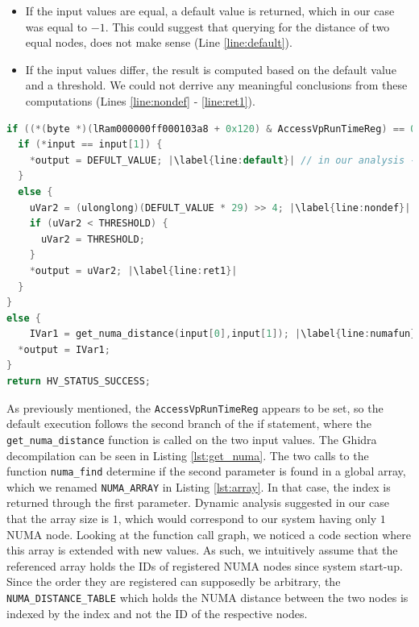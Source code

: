 \documentclass[runningheads]{llncs}
\newcommand{\cc}{\lstinline[mathescape]}
\begin{document}
\begin{itemize}
    \item If the input values are equal, a default value is returned, which
        in our case was equal to $-1$. This could suggest that querying for
        the distance of two equal nodes, does not make sense (Line
        \ref{line:default}).
    \item If the input values differ, the result is computed based on the 
        default value and a threshold. We could not derrive any meaningful
        conclusions from these computations (Lines \ref{line:nondef} -
        \ref{line:ret1}).
\end{itemize}

\vspace{-2mm}
\begin{lstlisting}[language=c, label={lst:numaif}, 
    caption={Decompilartion of the \cc{HvCallQueryNumaDistance} hypercall
    handler, after being ``beautified'' in Gidra.}]
if ((*(byte *)(lRam000000ff000103a8 + 0x120) & AccessVpRunTimeReg) == 0) {
  if (*input == input[1]) {
    *output = DEFULT_VALUE; |\label{line:default}| // in our analysis -1
  }
  else {
    uVar2 = (ulonglong)(DEFULT_VALUE * 29) >> 4; |\label{line:nondef}|
    if (uVar2 < THRESHOLD) {
      uVar2 = THRESHOLD;
    }
    *output = uVar2; |\label{line:ret1}|
  }
}
else {
    IVar1 = get_numa_distance(input[0],input[1]); |\label{line:numafun}|
  *output = IVar1;
}
return HV_STATUS_SUCCESS;
\end{lstlisting}

\vspace{-1mm}

As previously mentioned, the \cc{AccessVpRunTimeReg} appears to be set, so the
default execution follows the second branch of the if statement, where the
\\\cc{get_numa_distance} function is called on the two input values. The Ghidra
decompilation can be seen in Listing \ref{lst:get_numa}. The two calls to the
function \cc{numa_find} determine if the second parameter is found in a global
array, which we renamed \cc{NUMA_ARRAY} in Listing \ref{lst:array}. In that
case, the index is returned through the first parameter. Dynamic analysis
suggested in our case that the array size is $1$, which would correspond to our
system having only $1$ NUMA node. Looking at the function call graph, we
noticed a code section where this array is extended with new values. As such,
we intuitively assume that the referenced array holds the IDs of registered
NUMA nodes since system start-up. Since the order they are registered can
supposedly be arbitrary, the \cc{NUMA_DISTANCE_TABLE} which holds the NUMA
distance between the two nodes is indexed by the index and not the ID of the
respective nodes.
\end{document}
